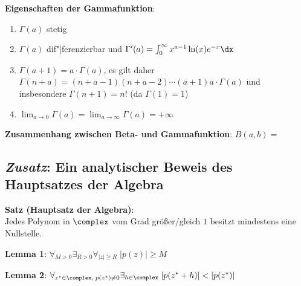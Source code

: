 \textbf{Eigenschaften der Gammafunktion}:
\begin{enumerate}
    \item
    $\Gamma(a)$ stetig
    
    \item
    $\Gamma(a)$ dif"|ferenzierbar und
    $\Gamma'(a) = \int_0^\infty x^{a-1} \ln(x) e^{-x} \dx$
    
    \item
    $\Gamma(a + 1) = a \cdot \Gamma(a)$, es gilt daher
    $\Gamma(n + a) = (n + a - 1) (n + a - 2) \dotsm (a + 1) a \cdot \Gamma(a)$
    und insbesondere $\Gamma(n + 1) = n!$
    (da $\Gamma(1) = 1$)
    
    \item
    $\lim_{a \to 0} \Gamma(a) = \lim_{a \to \infty} \Gamma(a) = +\infty$
\end{enumerate}

\linie

\textbf{Zusammenhang zwischen Beta- und Gammafunktion}:
$B(a, b) =$ 

\subsection{%
    \emph{Zusatz}: Ein analytischer Beweis des Hauptsatzes der Algebra%
}

\textbf{Satz (Hauptsatz der Algebra)}: \\
Jedes Polynom in $\complex$ vom Grad größer/gleich $1$ besitzt mindestens
eine Nullstelle.

\textbf{Lemma 1}:
$\forall_{M > 0} \exists_{R > 0} \forall_{|z| \ge R}\; |p(z)| \ge M$

\textbf{Lemma 2}:
$\forall_{z^\ast \in \complex,\; p(z^\ast) \not= 0} \exists_{h \in \complex}\;
|p(z^\ast + h)| < |p(z^\ast)|$

\pagebreak

